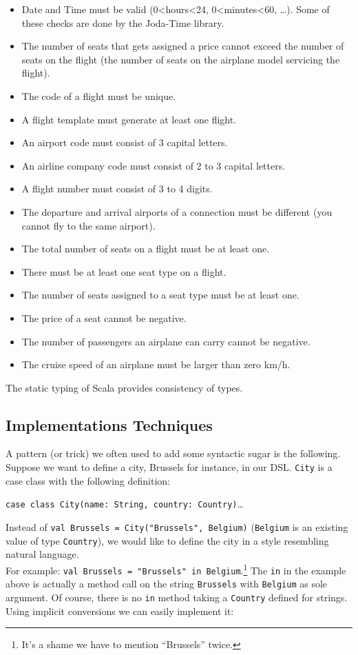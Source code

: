 \documentclass[a4paper]{article}
\newcommand{\cc}[1]{\texttt{#1}}
\renewcommand{\sc}[1]{\lstinline{#1}}
\begin{document}
\begin{itemize}
 \item Date and Time must be valid (0<hours<24, 0<minutes<60, \dots). Some of these checks are done by the Joda-Time library.
 \item The number of seats that gets assigned a price cannot exceed the number of seats on the flight (the number of seats on the airplane model servicing the flight).
 \item The code of a flight must be unique.
 \item A flight template must generate at least one flight.
 \item An airport code must consist of 3 capital letters.
 \item An airline company code must consist of 2 to 3 capital letters.
 \item A flight number must consist of 3 to 4 digits.
 \item The departure and arrival airports of a connection must be different (you cannot fly to the same airport).
 \item The total number of seats on a flight must be at least one.
 \item There must be at least one seat type on a flight.
 \item The number of seats assigned to a seat type must be at least one.
 \item The price of a seat cannot be negative.
 \item The number of passengers an airplane can carry cannot be negative.
 \item The cruise speed of an airplane must be larger than zero km/h.
\end{itemize}

The static typing of Scala provides consistency of types.

\subsection{Implementations Techniques}
\label{sec:implementation-techniques}

A pattern (or trick) we often used to add some syntactic sugar is the following.
Suppose we want to define a city, Brussels for instance, in our DSL\@.
\cc{City} is a case class with the following definition:

\sc{case class City(name: String, country: Country)}\ldots{}

Instead of \sc{val Brussels = City("Brussels", Belgium)} (\cc{Belgium} is an existing value of type \cc{Country}), we would like to define the city in a style resembling natural language.\\
For example: \sc{val Brussels = "Brussels" in Belgium}.\footnote{It's a shame we have to mention ``Brussels'' twice.}
The \sc{in} in the example above is actually a method call on the string \cc{Brussels} with \cc{Belgium} as sole argument.
Of course, there is no \sc{in} method taking a \cc{Country} defined for strings.
Using implicit conversions we can easily implement it:
\end{document}
